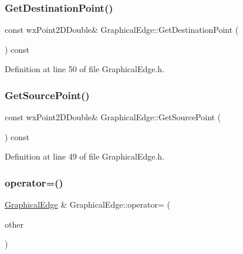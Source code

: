 \subsubsection{\texorpdfstring{Get\+Destination\+Point()}{GetDestinationPoint()}}
{\footnotesize\ttfamily const wx\+Point2\+D\+Double\& Graphical\+Edge\+::\+Get\+Destination\+Point (\begin{DoxyParamCaption}{ }\end{DoxyParamCaption}) const\hspace{0.3cm}{\ttfamily [inline]}}



Definition at line 50 of file Graphical\+Edge.\+h.

\mbox{\label{class_graphical_edge_af8738fa9de63d51bec94fae3bebbe4ac}} 
\subsubsection{\texorpdfstring{Get\+Source\+Point()}{GetSourcePoint()}}
{\footnotesize\ttfamily const wx\+Point2\+D\+Double\& Graphical\+Edge\+::\+Get\+Source\+Point (\begin{DoxyParamCaption}{ }\end{DoxyParamCaption}) const\hspace{0.3cm}{\ttfamily [inline]}}



Definition at line 49 of file Graphical\+Edge.\+h.

\mbox{\label{class_graphical_edge_ad590b20ea1c1cb30a15850a36f82a2c9}} 
\subsubsection{\texorpdfstring{operator=()}{operator=()}}
{\footnotesize\ttfamily \hyperlink{class_graphical_edge}{Graphical\+Edge} \& Graphical\+Edge\+::operator= (\begin{DoxyParamCaption}\item[{const \hyperlink{class_graphical_edge}{Graphical\+Edge} \&}]{other }\end{DoxyParamCaption})}



